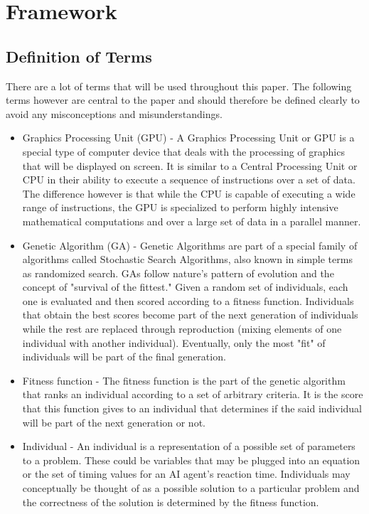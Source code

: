 \chapter{Framework}

\section{Definition of Terms}

There are a lot of terms that will be used throughout this paper.
The following terms however are central to the paper and should therefore be defined clearly
to avoid any misconceptions and misunderstandings.

\begin{itemize}
 \item Graphics Processing Unit (GPU) -  A Graphics Processing Unit or GPU is a special type
of computer device that deals with the processing of graphics that will be displayed
on screen. It is similar to a Central Processing Unit or CPU in their ability to execute
a sequence of instructions over a set of data. The difference however is that while the
CPU is capable of executing a wide range of instructions, the GPU is specialized to perform
highly intensive mathematical computations and over a large set of data in a parallel manner.

 \item Genetic Algorithm (GA) - Genetic Algorithms are part of a special family of algorithms
called Stochastic Search Algorithms, also known in simple terms as randomized search. GAs
follow nature's pattern of evolution and the concept of "survival of the fittest." Given
a random set of individuals, each one is evaluated and then scored according to a fitness function.
Individuals that obtain the best scores become part of the next generation of individuals while the
rest are replaced through reproduction (mixing elements of one individual with another individual).
Eventually, only the most "fit" of individuals will be part of the final generation.

 \item Fitness function - The fitness function is the part of the genetic algorithm that ranks
an individual according to a set of arbitrary criteria. It is the score that this function
gives to an individual that determines if the said individual will be part of the next generation
or not.

 \item Individual - An individual is a representation of a possible set of parameters to a problem.
These could be variables that may be plugged into an equation or the set of timing values for an
AI agent's reaction time. Individuals may conceptually be thought of as a possible solution to a
particular problem and the correctness of the solution is determined by the fitness function.


\end{itemize}
